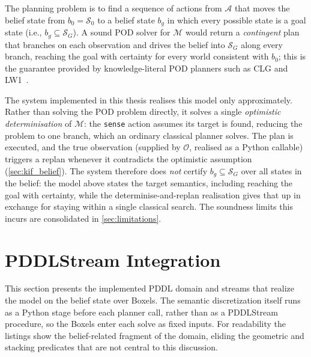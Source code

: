 The planning problem is to find a sequence of actions from $\mathcal{A}$ that moves the belief state from $b_0 = \mathcal{S}_0$ to a belief state $b_g$ in which every possible state is a goal state (i.e., $b_g \subseteq \mathcal{S}_G$). A sound POD solver for $\mathcal{M}$ would return a \emph{contingent} plan that branches on each observation and drives the belief into $\mathcal{S}_G$ along every branch, reaching the goal with certainty for every world consistent with $b_0$; this is the guarantee provided by knowledge-literal POD planners such as CLG and LW1~\cite{albore2009translation, bonet2014flexible}.

The system implemented in this thesis realises this model only approximately. Rather than solving the POD problem directly, it solves a single \emph{optimistic determinisation} of $\mathcal{M}$: the \texttt{sense} action assumes its target is found, reducing the problem to one branch, which an ordinary classical planner solves. The plan is executed, and the true observation (supplied by $\mathcal{O}$, realised as a Python callable) triggers a replan whenever it contradicts the optimistic assumption (\cref{sec:kif_belief}). The system therefore does \emph{not} certify $b_g \subseteq \mathcal{S}_G$ over all states in the belief: the model above states the target semantics, including reaching the goal with certainty, while the determinise-and-replan realisation gives that up in exchange for staying within a single classical search. The soundness limits this incurs are consolidated in \cref{sec:limitations}.

\section{PDDLStream Integration}
This section presents the implemented PDDL domain and streams that realize the model on the belief state over Boxels. The semantic discretization itself runs as a Python stage before each planner call, rather than as a PDDLStream procedure, so the Boxels enter each solve as fixed inputs. For readability the listings show the belief-related fragment of the domain, eliding the geometric and stacking predicates that are not central to this discussion.

